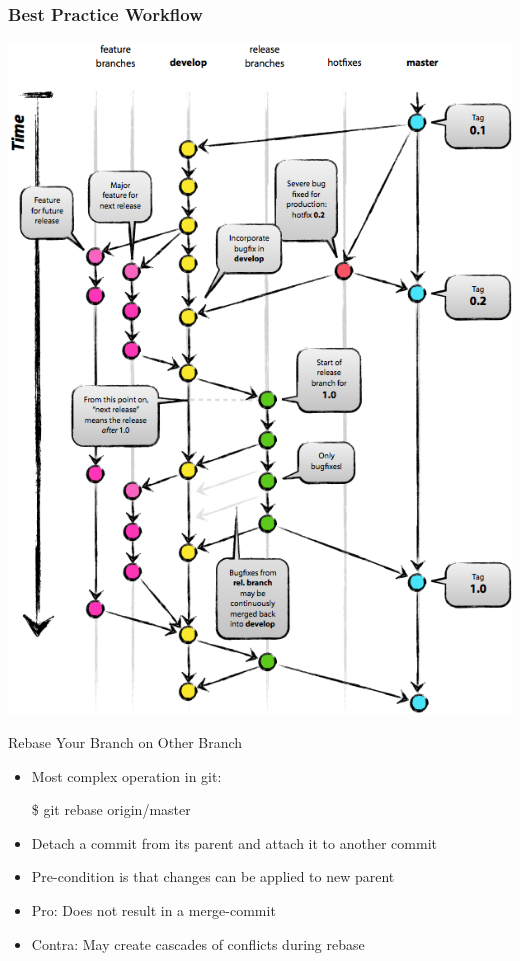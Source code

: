 \documentclass[18pt,mathserif]{beamer}
\newenvironment{shell}[1][\linewidth]
  {\begin{mdframed}[
  skipabove=\topsep,
  skipbelow=\topsep,
  font=\ttfamily,
  linecolor=black!9,
  backgroundcolor=black!9,
  innertopmargin=6pt,
  innerbottommargin=6pt,
  innerleftmargin=6pt,
  innerrightmargin=6pt,
  userdefinedwidth=#1]}
  {\end{mdframed}}
\begin{document}
\begin{frame}
	\frametitle{Best Practice Workflow}
	\includegraphics[height=\textheight]{images/master-develop-feature-branches.png}
\end{frame}


\begin{frame}{Rebase Your Branch on Other Branch}
  \begin{itemize}
    \item Most complex operation in git:
      \begin{shell}
        \$ git rebase origin/master
      \end{shell}
    \item Detach a commit from its parent and attach it to another commit
    \item Pre-condition is that changes can be applied to new parent
    \item Pro: Does not result in a merge-commit
    \item Contra: May create cascades of conflicts during rebase
  \end{itemize}
\end{frame}
\end{document}
